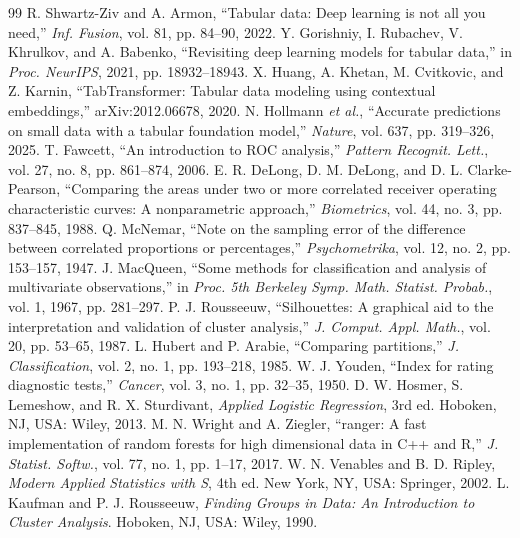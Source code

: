 \documentclass[conference]{IEEEtran}
\begin{document}
\begin{thebibliography}{99}
 R. Shwartz-Ziv and A. Armon, ``Tabular data: Deep learning is not all you need,'' \emph{Inf. Fusion}, vol. 81, pp. 84--90, 2022.
 Y. Gorishniy, I. Rubachev, V. Khrulkov, and A. Babenko, ``Revisiting deep learning models for tabular data,'' in \emph{Proc. NeurIPS}, 2021, pp. 18932--18943.
 X. Huang, A. Khetan, M. Cvitkovic, and Z. Karnin, ``TabTransformer: Tabular data modeling using contextual embeddings,'' arXiv:2012.06678, 2020.
 N. Hollmann \emph{et al.}, ``Accurate predictions on small data with a tabular foundation model,'' \emph{Nature}, vol. 637, pp. 319--326, 2025.
 T. Fawcett, ``An introduction to ROC analysis,'' \emph{Pattern Recognit. Lett.}, vol. 27, no. 8, pp. 861--874, 2006.
 E. R. DeLong, D. M. DeLong, and D. L. Clarke-Pearson, ``Comparing the areas under two or more correlated receiver operating characteristic curves: A nonparametric approach,'' \emph{Biometrics}, vol. 44, no. 3, pp. 837--845, 1988.
 Q. McNemar, ``Note on the sampling error of the difference between correlated proportions or percentages,'' \emph{Psychometrika}, vol. 12, no. 2, pp. 153--157, 1947.
 J. MacQueen, ``Some methods for classification and analysis of multivariate observations,'' in \emph{Proc. 5th Berkeley Symp. Math. Statist. Probab.}, vol. 1, 1967, pp. 281--297.
 P. J. Rousseeuw, ``Silhouettes: A graphical aid to the interpretation and validation of cluster analysis,'' \emph{J. Comput. Appl. Math.}, vol. 20, pp. 53--65, 1987.
 L. Hubert and P. Arabie, ``Comparing partitions,'' \emph{J. Classification}, vol. 2, no. 1, pp. 193--218, 1985.
 W. J. Youden, ``Index for rating diagnostic tests,'' \emph{Cancer}, vol. 3, no. 1, pp. 32--35, 1950.
 D. W. Hosmer, S. Lemeshow, and R. X. Sturdivant, \emph{Applied Logistic Regression}, 3rd ed. Hoboken, NJ, USA: Wiley, 2013.
 M. N. Wright and A. Ziegler, ``ranger: A fast implementation of random forests for high dimensional data in C++ and R,'' \emph{J. Statist. Softw.}, vol. 77, no. 1, pp. 1--17, 2017.
 W. N. Venables and B. D. Ripley, \emph{Modern Applied Statistics with S}, 4th ed. New York, NY, USA: Springer, 2002.
 L. Kaufman and P. J. Rousseeuw, \emph{Finding Groups in Data: An Introduction to Cluster Analysis}. Hoboken, NJ, USA: Wiley, 1990.
\end{thebibliography}
\end{document}
